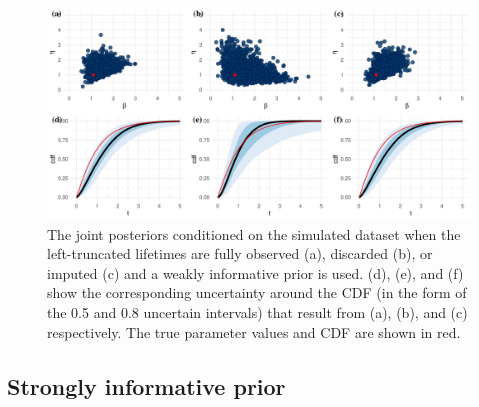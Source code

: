 \begin{figure}
    \centering
    \includegraphics[width=1\textwidth]{./figures/ch-2/joint-posts.pdf}
    \caption{The joint posteriors conditioned on the simulated dataset when the left-truncated lifetimes are fully observed (a), discarded (b), or imputed (c) and a weakly informative prior is used. (d), (e), and (f) show the corresponding uncertainty around the CDF (in the form of the 0.5 and 0.8 uncertain intervals) that result from (a), (b), and (c) respectively. The true parameter values and CDF are shown in red.}
    \label{fig:joint-post-weibull}
\end{figure}

\subsection{Strongly informative prior} \label{subsec:weibull-model-fits-informative}

